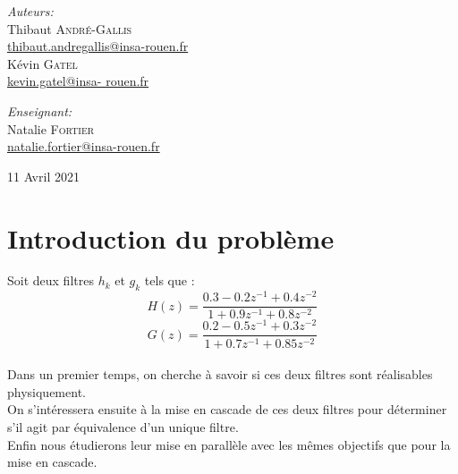 \documentclass[12,french]{report}
\begin{document}
\begin{titlepage}
\begin{center}
	\begin{minipage}{0.4\textwidth}
		\begin{flushleft} \large
			\emph{Auteurs:}\\
			Thibaut \textsc{André-Gallis} \\
			{\small\href{mailto:thibaut.andregallis@insa-rouen.fr}{thibaut.andregallis@insa-rouen.fr}} \\
			Kévin \textsc{Gatel} \\
			{\small\href{mailto:kevin.gatel@insa-rouen.fr}{kevin.gatel@insa-				rouen.fr}}
		\end{flushleft}
	\end{minipage}
	\begin{minipage}{0.4\textwidth}
		\begin{flushright} \large
			\emph{Enseignant:} \\
			Natalie \textsc{Fortier} \\
			{\small\href{mailto:natalie.fortier@insa-rouen.fr}								{natalie.fortier@insa-rouen.fr}}
		\end{flushright}
	\end{minipage}

	\vfill
	{\large 11 Avril 2021}
\end{center}
\end{titlepage}

\tableofcontents


\renewcommand{\chaptername}{}
\chapter*{Introduction du problème}

Soit deux filtres $h_k$ et $g_k$ tels que :\\

$$ H(z) = \frac{0.3-0.2z^{-1}+0.4z^{-2}}{1+0.9z^{-1}+0.8z^{-2}} $$
$$ G(z) = \frac{0.2-0.5z^{-1}+0.3z^{-2}}{1+0.7z^{-1}+0.85z^{-2}} $$ \\

Dans un premier temps, on cherche à savoir si ces deux filtres sont réalisables physiquement.\\

On s’intéressera ensuite à la mise en cascade de ces deux filtres pour déterminer s'il agit par équivalence d'un unique filtre.\\

Enfin nous étudierons leur mise en parallèle avec les mêmes objectifs que pour la mise en cascade.
\end{document}
